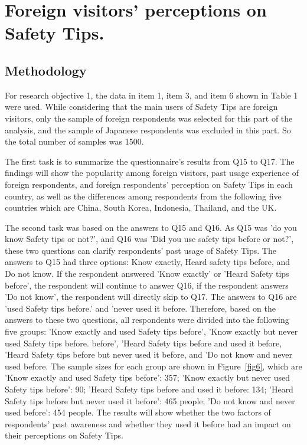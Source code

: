 \chapter{Foreign visitors' perceptions on Safety Tips.}
\label{c4}

\section{Methodology}
For research objective 1, the data in item 1, item 3, and item 6 shown in Table 1 were used. While considering that the main users of Safety Tips are foreign visitors, only the sample of foreign respondents was selected for this part of the analysis, and the sample of Japanese respondents was excluded in this part. So the total number of samples was 1500.

The first task is to summarize the questionnaire's results from Q15 to Q17. The findings will show the popularity among foreign visitors, past usage experience of foreign respondents, and foreign respondents' perception on Safety Tips in each country, as well as the differences among respondents from the following five countries which are China, South Korea, Indonesia, Thailand, and the UK.

The second task was based on the answers to Q15 and Q16. As Q15 was 'do you know Safety tips or not?', and Q16 was 'Did you use safety tips before or not?', these two questions can clarify respondents' past usage of Safety Tips. The answers to Q15 had three options: Know exactly, Heard safety tips before, and Do not know. If the respondent answered 'Know exactly' or 'Heard Safety tips before', the respondent will continue to answer Q16, if the respondent answers 'Do not know', the respondent will directly skip to Q17. The answers to Q16 are 'used Safety tips before.' and 'never used it before. Therefore, based on the answers to these two questions, all respondents were divided into the following five groups: 'Know exactly and used Safety tips before', 'Know exactly but never used Safety tips before. before', 'Heard Safety tips before and used it before, 'Heard Safety tips before but never used it before, and 'Do not know and never used before. The sample sizes for each group are shown in Figure~\ref{fig6}, which are 'Know exactly and used Safety tips before': 357; 'Know exactly but never used Safety tips before': 90; 'Heard Safety tips before and used it before: 134; 'Heard Safety tips before but never used it before': 465 people; 'Do not know and never used before': 454 people. The results will show whether the two factors of respondents' past awareness and whether they used it before had an impact on their perceptions on Safety Tips.

